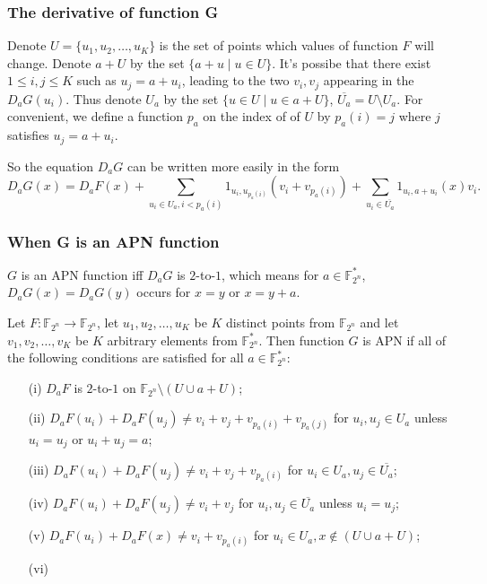 \documentclass[
    aspectratio=169,                   %
]{beamer}
\newcommand{\F}{\mathbb{F}}
\begin{document}
    \begin{frame}
        \frametitle{The derivative of function G}
    
        Denote $ U=\{u_1,u_2,\dots,u_K\} $ is the set of points which values of function $ F $ will change. Denote $ a+U $ by the set $ \{a+u\mid u\in U\} $.
        It's possibe that there exist $ 1\leq i,j\leq K $ such as $ u_j=a+u_i $, leading to the two $ v_i,v_j $ appearing in the $ D_aG(u_i) $.
        Thus denote $ U_a $ by the set $ \{u\in U\mid u\in a+U \} $, $ \overline{U_a}=U\setminus U_a $. For convenient, we define a function $ p_a $ on
        the index of of $ U $ by $ p_a(i)=j $ where $ j $ satisfies $ u_j=a+u_i $.
        
        So the equation $ D_aG $ can be written more easily in the form
        \[D_aG(x)=D_aF(x)+\sum_{u_i\in U_a,i<p_a(i)}1_{u_i,u_{p_a(i)}}(v_i+v_{p_a(i)})+\sum_{u_i\in\overline{U_a}}1_{u_i,a+u_i}(x)v_i.\]
    
    \end{frame}

    \begin{frame}
        \frametitle{When G is an APN function}
    
        $ G $ is an APN function iff $ D_aG $ is $ 2 $-to-$ 1 $, which means for $ a\in\F_{2^n}^* $, $ D_aG(x)=D_aG(y) $ occurs for $ x=y $ or $ x=y+a $.

        \begin{theorem}
            Let $ F : \F_{2^n} \rightarrow \F_{2^n} $, let $ u_1, u_2, \dots , u_K $ be $K$ distinct points from $\F_{2^n}$ and let $ v_1, v_2, \dots , v_K $ be $K$ arbitrary elements from $ \F_{2^n}^* $. Then function $ G $ is APN if all of the following conditions are satisfied for all $ a\in\F_{2^n}^* $:
            \begin{enumerate}
                \item[(i)] $ D_aF $ is $ 2 $-to-$ 1 $ on $ \F_{2^n}\setminus (U\cup a+U) $;
                \item[(ii)] $D_{a} F(u_{i})+D_{a} F(u_{j}) \neq v_{i}+v_{j}+v_{p_{a}(i)}+v_{p_{a}(j)}$ for $u_{i}, u_{j} \in U_{a}$ unless $u_{i}=u_{j}$ or $u_{i}+u_{j}=a$;
                \item[(iii)] $D_{a} F\left(u_{i}\right)+D_{a} F\left(u_{j}\right) \neq v_{i}+v_{j}+v_{p_{a}(i)}$ for $u_{i} \in U_{a}, u_{j} \in \overline{U_{a}}$;
                \item[(iv)] $D_{a} F\left(u_{i}\right)+D_{a} F\left(u_{j}\right) \neq v_{i}+v_{j}$ for $u_{i}, u_{j} \in \overline{U_{a}}$ unless $u_{i}=u_{j}$;
                \item[(v)]  $D_{a} F\left(u_{i}\right)+D_{a} F(x) \neq v_{i}+v_{p_{a}(i)}$ for $u_{i} \in U_{a}, x \notin(U \cup a+U)$;
                \item[(vi)] 
            \end{enumerate}
        \end{theorem}
    
    \end{frame}
\end{document}
